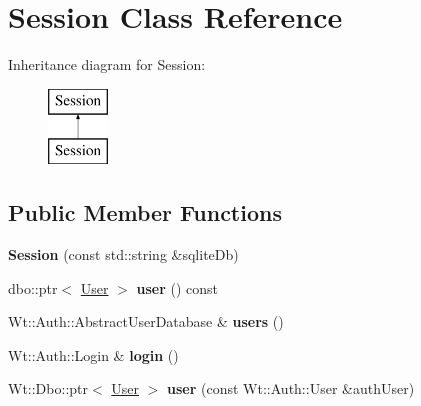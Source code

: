 \hypertarget{class_session}{}\section{Session Class Reference}
\label{class_session}
Inheritance diagram for Session\+:\begin{figure}[H]
\begin{center}
\leavevmode
\includegraphics[height=2.000000cm]{class_session}
\end{center}
\end{figure}
\subsection*{Public Member Functions}
\begin{DoxyCompactItemize}
\item 
\mbox{\label{class_session_ac5d36ef843286bb362c15d3f465f6b28}} 
{\bfseries Session} (const std\+::string \&sqlite\+Db)
\item 
\mbox{\label{class_session_a99e27734249e27c4e916312d09110b4d}} 
dbo\+::ptr$<$ \hyperlink{class_user}{User} $>$ {\bfseries user} () const
\item 
\mbox{\label{class_session_a5fa026d211daf8ebed692638dc5f6e96}} 
Wt\+::\+Auth\+::\+Abstract\+User\+Database \& {\bfseries users} ()
\item 
\mbox{\label{class_session_ac9b69619756936d8f27bc6702c334b1f}} 
Wt\+::\+Auth\+::\+Login \& {\bfseries login} ()
\item 
\mbox{\label{class_session_af4b107688e55ec0614d8181688c7dee7}} 
Wt\+::\+Dbo\+::ptr$<$ \hyperlink{class_user}{User} $>$ {\bfseries user} (const Wt\+::\+Auth\+::\+User \&auth\+User)
\end{DoxyCompactItemize}
